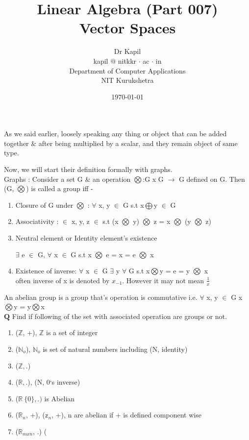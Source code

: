 \documentclass{article}
\title{Linear Algebra (Part 007)\\Vector Spaces}
\author{Dr Kapil\\kapil $@$ nitkkr $\cdot$ ac $\cdot$ in\\Department of Computer Applications\\ NIT Kurukshetra}
\date{\today}
\begin{document}
\maketitle
\thispagestyle{fancy}

As we said earlier, loosely speaking any thing or object that can be added together \& after being multiplied by a scalar, and they remain object of same type.

Now, we will start their definition formally with graphs. \\

Graphs : Consider a set G \& an operation $\bigotimes$:G x G $\rightarrow$ G defined on G. Then (G, $\bigotimes$) is called a group iff - 
\begin{enumerate}
    \item Closure of G under $\bigotimes$ : $\forall$ x, y $\in$ G s.t x$\bigoplus$y $\in$ G
    \item Associativity : $\in$ x, y, z $\in$ s.t (x $\bigotimes$ y) $\bigotimes$ z = x $\bigotimes$ (y $\bigotimes$ z)
    \item Neutral element or Identity element's existence \par $\exists$ e $\in$ G, $\forall$ x $\in$ G s.t x $\bigotimes$ e = x = e $\bigotimes$ x
    \item Existence of inverse: $\forall$ x $\in$ G $\exists$ y $\forall$ G s.t x$\bigotimes$y = e = y $\bigotimes$ x \\ often inverse of x is denoted by $x_{-1}$. However it may not mean $\frac{1}{x}$
\end{enumerate}

An abelian group is a group that's operation is commutative i.e. $\forall$ x, y $\in$ G  x$\bigotimes$y = y$\bigotimes$x\\

$\boldsymbol{Q}$ Find if following of the set with associated operation are groups or not.

\begin{enumerate}
    \item ($\mathbb{Z}$, +), $\mathbb{Z}$ is a set of integer 
    \item ($\mathbb{N}_o$), $\mathbb{N}_o$ is set of natural numbers including (N, identity)
    \item ($\mathbb{Z}, .$)
    \item ($\mathbb{R}, .$), (N, 0`s inverse)
    \item ($\mathbb{R} \ \{0\}, .)$ is Abelian
    \item ($\mathbb{R}_n$, +), ($\mathbb{z}_n$, +), n \in {} are abelian if + is defined component wise
    \item ($\mathbb{R}_{mxn}$, .) (
\end{enumerate}
\end{document}
